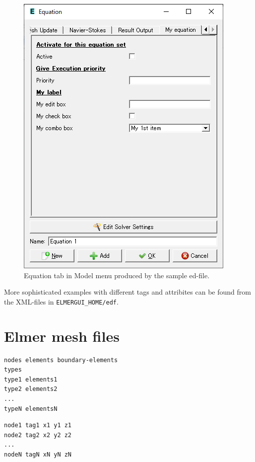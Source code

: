 \begin{figure}[htb]
\begin{center}
 \includegraphics[scale=0.5]{images/edfsample.png}
\caption{Equation tab in Model menu produced by the sample ed-file.}
\label{fig_equations}
\end{center}
\end{figure}

More sophisticated examples with different tags and attribites can be found from the XML-files in  {\tt ELMERGUI\_HOME/edf}.

\newpage

\chapter{Elmer mesh files}

\begin{verbatim}
nodes elements boundary-elements
types
type1 elements1
type2 elements2
...
typeN elementsN
\end{verbatim}

\vskip5mm

\begin{verbatim}
node1 tag1 x1 y1 z1
node2 tag2 x2 y2 z2
...
nodeN tagN xN yN zN
\end{verbatim}

